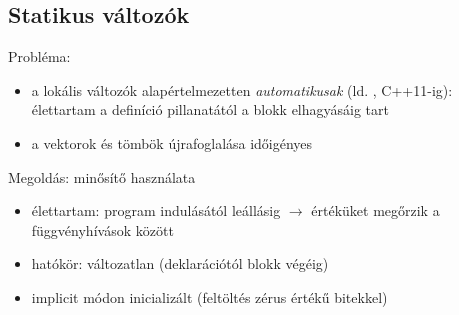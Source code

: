 \documentclass[usenames,dvipsnames,aspectratio=169]{beamer}
\begin{document}
\begin{frame}
  \begin{exampleblock}{}
    \scriptsize
    \vspace{-.2cm}
    
    \vspace{-.2cm}
  \end{exampleblock}
\end{frame}

\subsection{Statikus változók}
\begin{frame}
  Probléma:
  \begin{itemize}
    \item a lokális változók alapértelmezetten \emph{automatikusak} (ld. , C++11-ig): élettartam a definíció pillanatától a 
blokk elhagyásáig tart
    \item a vektorok és tömbök újrafoglalása időigényes
  \end{itemize}
  \vfill
  Megoldás:  minősítő használata
  \begin{itemize}
    \item élettartam: program indulásától leállásig $\to$ értéküket megőrzik a függvényhívások között
    \item hatókör: változatlan (deklarációtól blokk végéig)
    \item implicit módon inicializált (feltöltés zérus értékű bitekkel)
  \end{itemize}
\end{frame}

\begin{frame}
  \begin{exampleblock}{}
    \scriptsize
    \vspace{-.2cm}
    
    \vspace{-.2cm}
  \end{exampleblock}
\end{frame}

\end{document}
